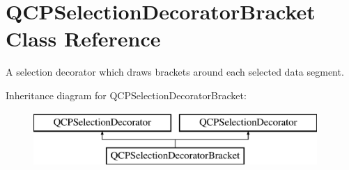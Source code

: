 \hypertarget{class_q_c_p_selection_decorator_bracket}{}\section{Q\+C\+P\+Selection\+Decorator\+Bracket Class Reference}
\label{class_q_c_p_selection_decorator_bracket}


A selection decorator which draws brackets around each selected data segment.  


Inheritance diagram for Q\+C\+P\+Selection\+Decorator\+Bracket\+:\begin{figure}[H]
\begin{center}
\leavevmode
\includegraphics[height=2.000000cm]{class_q_c_p_selection_decorator_bracket}
\end{center}
\end{figure}
